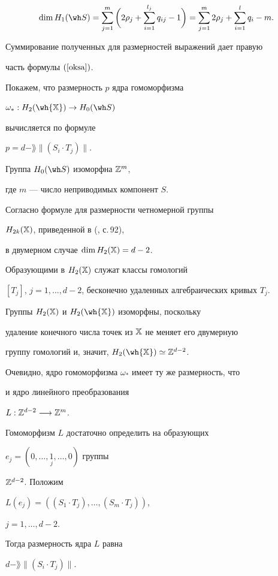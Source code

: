 \begin{pf}
$$


\dim H_1(\wh S )=


\sum\limits_{j=1}^m \bigg( 2\rho_j+


\sum\limits_{i=1}^{l_j} q_{ij}-1 \bigg) =


\sum\limits_{j=1}^m 2\rho_j+\sum\limits_{i=1}^l q_i-m.


$$


Суммирование полученных для размерностей выражений дает правую


часть формулы $(\ref{oksa})$.





Покажем, что размерность $p$ ядра гомоморфизма


$\omega_* : H_2(\wh{\Bbb X}) \rightarrow H_0(\wh S)$


вычисляется по формуле


$p = d - \rang \|(S_i \cdot T_j)\|$.


Группа $H_0 (\wh S)$ изоморфна ${\Bbb Z}^{m}$,


где $m$ --- число неприводимых компонент $S$.


Согласно формуле для размерности четномерной группы


$H_{2k}(\Bbb X)$, приведенной в (\cite{Fu}, с.\,92),


в двумерном случае $\dim H_2(\Bbb X)=d-2$.


Образующими в $H_2(\Bbb X)$ служат классы гомологий


$[T_j]$, $j=1,\dotsc,d-2$, бесконечно удаленных алгебраических кривых $T_j$.


Группы $H_2(\Bbb X)$ и $H_2(\wh{\Bbb X})$ изоморфны, поскольку


удаление конечного числа точек из $\Bbb X$ не меняет его двумерную


группу гомологий и, значит, $H_2(\wh{\Bbb X})\simeq {\Bbb Z}^{d-2}$.


Очевидно, ядро гомоморфизма $\omega_*$ имеет ту же размерность, что


и ядро линейного преобразования


$L: \Bbb Z^{d-2} \longrightarrow \Bbb Z^m$.


Гомоморфизм $L$ достаточно определить на образующих


$e_j=(0,\dotsc,\underset{j}{1},\dotsc,0)$ группы


$\Bbb Z^{d-2}$. Положим


$L (e_j) = ( (S_1\cdot T_j),\dotsc, (S_m\cdot T_j))$,


$j=1,\dotsc,d-2.$


Тогда размерность ядра $L$ равна


$d - \rang \|(S_i \cdot T_j) \|$.


\end{pf}





